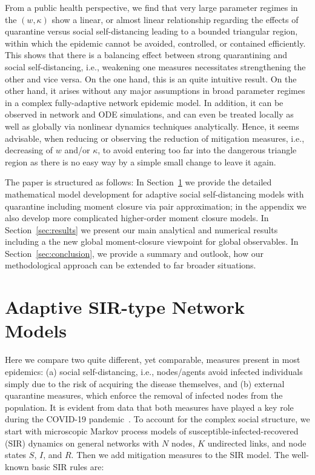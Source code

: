 \documentclass[12pt]{article}
\begin{document}
From a public health perspective, we find that very large parameter regimes in the $(w,\kappa)$ show a linear, or almost linear relationship regarding the effects of quarantine versus social self-distancing leading to a bounded triangular region, within which the epidemic cannot be avoided, controlled, or contained efficiently. This shows that there is a balancing effect between strong quarantining and social self-distancing, i.e., weakening one measures necessitates strengthening the other and vice versa. On the one hand, this is an quite intuitive result. On the other hand, it arises without any major assumptions in broad parameter regimes in a complex fully-adaptive network epidemic model. In addition, it can be observed in network and ODE simulations, and can even be treated locally as well as globally via nonlinear dynamics techniques analytically. Hence, it seems advisable, when reducing or observing the reduction of mitigation measures, i.e., decreasing of $w$ and/or $\kappa$, to avoid entering too far into the dangerous triangle region as there is no easy way by a simple small change to leave it again.\medskip  

The paper is structured as follows: In Section~\ref{sec:model} we provide the detailed mathematical model development for adaptive social self-distancing models with quarantine including moment closure via pair approximation; in the appendix we also develop more complicated higher-order moment closure models. In Section~\ref{sec:results} we present our main analytical and numerical results including a the new global moment-closure viewpoint for global observables. In Section~\ref{sec:conclusion}, we provide a summary and outlook, how our methodological approach can be extended to far broader situations. 

\section{Adaptive SIR-type Network Models}
\label{sec:model}

Here we compare two quite different, yet comparable, measures present in most epidemics: (a) social self-distancing, i.e., nodes/agents avoid infected individuals simply due to the risk of acquiring the disease themselves, and (b) external quarantine measures, which enforce the removal of infected nodes from the population. It is evident from data that both measures have played a key role during the COVID-19 pandemic~\cite{MaierBrockmann,Kucharskietal,Giordanoetal}. To account for the complex social structure, we start with microscopic Markov process  models of susceptible-infected-recovered (SIR) dynamics on general networks with $N$ nodes, $K$ undirected links, and node states $S$, $I$, and $R$. Then we add mitigation measures to the SIR model. The well-known basic SIR rules are:
\end{document}
